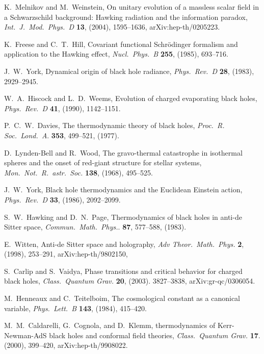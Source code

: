 \documentclass[12pt]{article}
\begin{document}
\begin{thebibliography}{999}
 K.\ Melnikov and M.\ Weinstein, On unitary 
evolution of a massless scalar field in a Schwarzschild background: 
Hawking radiation and the information paradox, \emph{Int.\ J.\
Mod.\ Phys.\ D} {\bf 13}, (2004), 1595--1636, arXiv:hep-th/0205223.

 K.\ Freese and C.~T.\ Hill, Covariant functional 
Schr{\"o}dinger formalism and application to the Hawking effect,
\emph{Nucl.\ Phys.\ B} {\bf 255}, (1985), 693--716.

 J.~W.\ York, Dynamical origin of black hole radiance,
\emph{Phys.\ Rev.\ D} {\bf 28}, (1983), 2929--2945.

 W.~A.\ Hiscock and L.~D.\ Weems, Evolution of 
charged evaporating black holes, \emph{Phys.\ Rev.\ D} {\bf 41}, 
(1990), 1142--1151.

 P.~C.~W.\ Davies, The thermodynamic theory of 
black holes, \emph{Proc.\ R. Soc.\ Lond.\ A}. {\bf 353}, 499--521,
(1977).


 D.\ Lynden-Bell and R.\ Wood, The gravo-thermal 
catastrophe in isothermal spheres and the onset of red-giant structure 
for stellar systems, \emph{Mon.\ Not.\ R.\ astr.\ Soc.} {\bf 138},
(1968), 495--525.

 J.~W.\ York, Black hole thermodynamics and the
 Euclidean Einstein action, \emph{Phys.\ Rev.\ D} {\bf 33}, (1986), 
2092--2099.

 S.~W.\ Hawking and D.~N.\ Page, Thermodynamics 
of black holes in anti-de Sitter space, \emph{Commun.\ Math.\ Phys.}. 
{\bf 87}, 577--588, (1983).

  E.\ Witten, Anti-de Sitter space and holography,
\emph{Adv Theor.\ Math.\ Phys.} {\bf 2}, (1998), 253--291,
arXiv:hep-th/9802150,

 S.\ Carlip and S.\ Vaidya, Phase transitions 
and critical behavior for charged black holes, \emph{Class.\ Quantum
Grav.} {\bf 20}, (2003). 3827--3838, arXiv:gr-qc/0306054.

 M.\ Henneaux and C.\ Teitelboim, The 
cosmological constant as a canonical variable, \emph{Phys.\ Lett.\ B}
{\bf 143}, (1984), 415--420.

 M.~M.\ Caldarelli, G.\ Cognola, and D.\ Klemm,
thermodynamics of Kerr-Newman-AdS black holes and conformal 
field theories, \emph{Class.\ Quantum Grav.} {\bf 17}. (2000), 
399--420, arXiv:hep-th/9908022.


\end{thebibliography}
\end{document}
